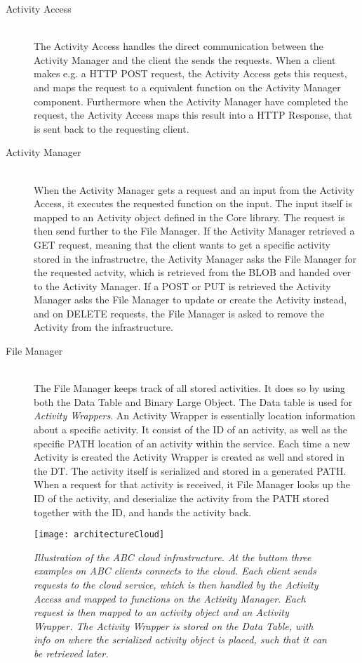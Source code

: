 \begin{description}
	\item[Activity Access] \hfill \\
	The Activity Access handles the direct communication between the Activity Manager and the client the sends the requests. When a client makes e.g. a HTTP POST request, the Activity Access gets this request, and maps the request to a equivalent function on the Activity Manager component. Furthermore when the Activity Manager have completed the request, the Activity Access maps this result into a HTTP Response, that is sent back to the requesting client.
	\item[Activity Manager] \hfill \\
	When the Activity Manager gets a request and an input from the Activity Access, it executes the requested function on the input. The input itself is mapped to an Activity object defined in the Core library. The request is then send further to the File Manager. If the Activity Manager retrieved a GET request, meaning that the client wants to get a specific activity stored in the infrastructre, the Activity Manager asks the File Manager for the requested actvity, which is retrieved from the BLOB and handed over to the Activity Manager. If a POST or PUT is retrieved the Activity Manager asks the File Manager to update or create the Activity instead, and on DELETE requests, the File Manager is asked to remove the Activity from the infrastructure.
	\item[File Manager] \hfill \\
	The File Manager keeps track of all stored activities. It does so by using both the Data Table and Binary Large Object. The Data table is used for \emph{Activity Wrappers}. An Activity Wrapper is essentially location information about a specific activity. It consist of the ID of an activity, as well as the specific PATH location of an activity within the service. Each time a new Activity is created the Activity Wrapper is created as well and stored in the DT. The activity itself is serialized and stored in a generated PATH. When a request for that activity is received, it File Manager looks up the ID of the activity, and deserialize the activity from the PATH stored together with the ID, and hands the activity back.
\end{description}

\par\vspace{\baselineskip}

\begin{figure}[!htbp]
  \centering
    \texttt{[image: architectureCloud]}
  \caption{\emph{Illustration of the ABC cloud infrastructure. At the buttom three examples on ABC clients connects to the cloud. Each client sends requests to the cloud service, which is then handled by the Activity Access and mapped to functions on the Activity Manager. Each request is then mapped to an activity object and an Activity Wrapper. The Activity Wrapper is stored on the Data Table, with info on where the serialized activity object is placed, such that it can be retrieved later.}}
  \label{fig:infrastructure}
\end{figure}

